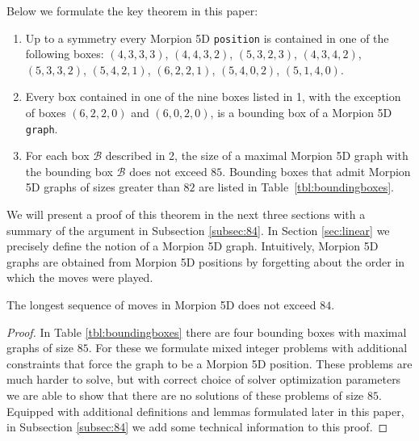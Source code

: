 Below we formulate the key theorem in this paper: %
\begin{theorem}
\begin{enumerate}
\item Up to a symmetry every Morpion 5D \texttt{position} is contained in one of the following boxes:
$(4, 3, 3, 3)$, $(4, 4, 3, 2)$, $(5, 3, 2, 3)$, $(4, 3, 4, 2)$, $(5, 3, 3, 2)$, $(5, 4, 2, 1)$, 
$(6, 2, 2, 1)$, $(5, 4, 0, 2)$, $(5, 1, 4, 0)$. \label{thm:boxes:list}
\item Every box contained in one of the nine boxes listed in 1, with the exception of boxes $(6, 2, 2, 0)$ 
  and $(6, 0, 2, 0)$, is a bounding box of a Morpion 5D \texttt{graph}.
\item For each box $\mathcal{B}$ described in 2, the size of a maximal Morpion 5D graph with the bounding box $\mathcal{B}$ does not exceed $85$.
  Bounding boxes that admit Morpion 5D graphs of sizes greater than $82$ are listed 
    in Table~\ref{tbl:boundingboxes}. 
\end{enumerate} 
\label{thm:boxes}
\end{theorem}
We will present a proof of this theorem in the next three sections with a summary of the argument in Subsection \ref{subsec:84}. 
In Section \ref{sec:linear} we precisely define the notion of a Morpion 5D graph. Intuitively, Morpion 5D graphs are obtained from Morpion 5D positions by forgetting about the order in which the moves were played.





\begin{corollary}
\label{cor:84}
The longest sequence of moves in Morpion 5D does not exceed $84$.
\end{corollary}
\begin{proof} 
In Table \ref{tbl:boundingboxes} there are four bounding boxes with maximal graphs of size $85$. 
For these we formulate mixed integer problems with additional constraints that force the graph to
  be a Morpion 5D position.
These problems are much harder to solve, but with correct choice of solver optimization parameters we are able to show
  that there are no solutions of these problems of size $85$. Equipped with additional definitions and lemmas formulated later in this paper, in Subsection \ref{subsec:84} we add some technical 
information to this proof. 
\end{proof}
